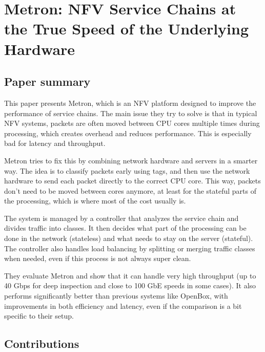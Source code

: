 \documentclass[a4paper, 12pt]{article}
\begin{document}
\section*{Metron: NFV Service Chains at the True Speed of the Underlying Hardware}
\subsection{Paper summary}

This paper presents Metron, which is an NFV platform designed to improve the performance of service chains. The main issue they try to solve is that in typical NFV systems, packets are often moved between CPU cores multiple times during processing, which creates overhead and reduces performance. This is especially bad for latency and throughput.

Metron tries to fix this by combining network hardware and servers in a smarter way. The idea is to classify packets early using tags, and then use the network hardware to send each packet directly to the correct CPU core. This way, packets don't need to be moved between cores anymore, at least for the stateful parts of the processing, which is where most of the cost usually is.

The system is managed by a controller that analyzes the service chain and divides traffic into classes. It then decides what part of the processing can be done in the network (stateless) and what needs to stay on the server (stateful). The controller also handles load balancing by splitting or merging traffic classes when needed, even if this process is not always super clean.

They evaluate Metron and show that it can handle very high throughput (up to 40 Gbps for deep inspection and close to 100 GbE speeds in some cases). It also performs significantly better than previous systems like OpenBox, with improvements in both efficiency and latency, even if the comparison is a bit specific to their setup.

\subsection{Contributions}
\end{document}

